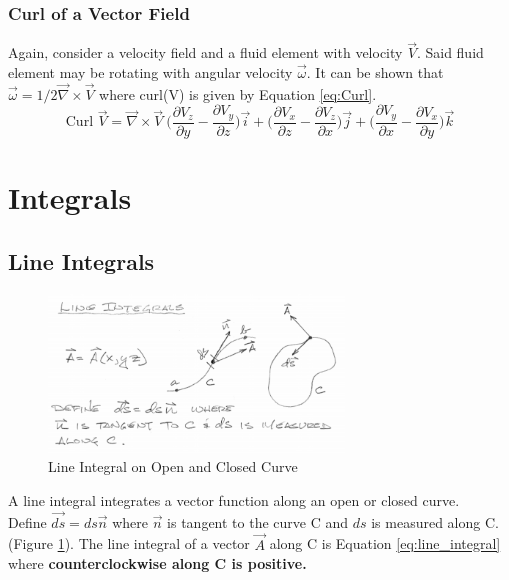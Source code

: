 \documentclass[draft=false, titlepage]{article}
\newcommand{\gradient}{\vec{\nabla}}
\begin{document}
\subsubsection{Curl of a Vector Field}
Again, consider a velocity field and a fluid element with velocity $\vec{V}$. Said fluid element may be rotating with angular velocity $\vec{\omega}$. It can be shown that $\vec{\omega} = 1/2 \gradient \times \vec{V}$ where curl(V) is given by Equation \ref{eq:Curl}.
\begin{equation}
    \text{Curl } \vec{V} = \gradient \times \vec{V} \ \Big( \frac{\partial V_z}{\partial y} - \frac{\partial V_y}{\partial z} \Big) \vec{i} + 
    \Big( \frac{\partial V_x}{\partial z} - \frac{\partial V_z}{\partial x} \Big) \vec{j} +
    \Big( \frac{\partial V_y}{\partial x} - \frac{\partial V_x}{\partial y} \Big) \vec{k}
    \label{eq:Curl}
\end{equation}

\section{Integrals}
\subsection{Line Integrals}
\begin{figure}[ht]
    \centering
    \includegraphics[width=0.7\textwidth]{Figures/line_integrals.PNG}
    \caption{Line Integral on Open and Closed Curve}
    \label{fig:line_integral}
\end{figure}

A line integral integrates a vector function along an open or closed curve.\\
Define $\vec{ds} = ds\vec{n}$ where $\vec{n}$ is tangent to the curve C and $ds$ is measured along C. (Figure \ref{fig:line_integral}). The line integral of a vector  $\vec{A}$ along C is Equation \ref{eq:line_integral} where \textbf{counterclockwise along C is positive.}
\end{document}
